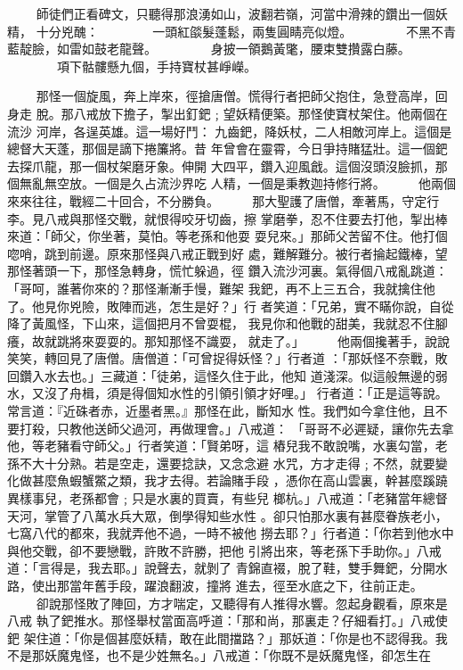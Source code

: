 \begin{pinyinscope}
{　　
師徒們正看碑文，只聽得那浪湧如山，波翻若嶺，河當中滑辣的鑽出一個妖精，
十分兇醜：
　　　　一頭紅燄髮蓬鬆，兩隻圓睛亮似燈。
　　　　不黑不青藍靛臉，如雷如鼓老龍聲。
　　　　身披一領鵝黃氅，腰束雙攢露白藤。
　　　　項下骷髏懸九個，手持寶杖甚崢嶸。

　　
那怪一個旋風，奔上岸來，徑搶唐僧。慌得行者把師父抱住，急登高岸，回身走
脫。那八戒放下擔子，掣出釘鈀﹔望妖精便築。那怪使寶杖架住。他兩個在流沙
河岸，各逞英雄。這一場好鬥：
九齒鈀，降妖杖，二人相敵河岸上。這個是總督大天蓬，那個是謫下捲簾將。昔
年曾會在靈霄，今日爭持賭猛壯。這一個鈀去探爪龍，那一個杖架磨牙象。伸開
大四平，鑽入迎風戧。這個沒頭沒臉抓，那個無亂無空放。一個是久占流沙界吃
人精，一個是秉教迦持修行將。
　　
他兩個來來往往，戰經二十回合，不分勝負。
　　
那大聖護了唐僧，牽著馬，守定行李。見八戒與那怪交戰，就恨得咬牙切齒，擦
掌磨拳，忍不住要去打他，掣出棒來道：「師父，你坐著，莫怕。等老孫和他耍
耍兒來。」那師父苦留不住。他打個唿哨，跳到前邊。原來那怪與八戒正戰到好
處，難解難分。被行者掄起鐵棒，望那怪著頭一下，那怪急轉身，慌忙躲過，徑
鑽入流沙河裏。氣得個八戒亂跳道：「哥呵，誰著你來的？那怪漸漸手慢，難架
我鈀，再不上三五合，我就擒住他了。他見你兇險，敗陣而逃，怎生是好？」行
者笑道：「兄弟，實不瞞你說，自從降了黃風怪，下山來，這個把月不曾耍棍，
我見你和他戰的甜美，我就忍不住腳癢，故就跳將來耍耍的。那知那怪不識耍，
就走了。」
　　
他兩個攙著手，說說笑笑，轉回見了唐僧。唐僧道：「可曾捉得妖怪？」行者道
：「那妖怪不奈戰，敗回鑽入水去也。」三藏道：「徒弟，這怪久住于此，他知
道淺深。似這般無邊的弱水，又沒了舟楫，須是得個知水性的引領引領才好哩。」
行者道：「正是這等說。常言道：『近硃者赤，近墨者黑。』那怪在此，斷知水
性。我們如今拿住他，且不要打殺，只教他送師父過河，再做理會。」八戒道：
「哥哥不必遲疑，讓你先去拿他，等老豬看守師父。」行者笑道：「賢弟呀，這
樁兒我不敢說嘴，水裏勾當，老孫不大十分熟。若是空走，還要捻訣，又念念避
水咒，方才走得﹔不然，就要變化做甚麼魚蝦蟹鱉之類，我才去得。若論賭手段
，憑你在高山雲裏，幹甚麼蹊蹺異樣事兒，老孫都會﹔只是水裏的買賣，有些兒
榔杭。」八戒道：「老豬當年總督天河，掌管了八萬水兵大眾，倒學得知些水性
。卻只怕那水裏有甚麼眷族老小，七窩八代的都來，我就弄他不過，一時不被他
撈去耶？」行者道：「你若到他水中與他交戰，卻不要戀戰，許敗不許勝，把他
引將出來，等老孫下手助你。」八戒道：「言得是，我去耶。」說聲去，就剝了
青錦直裰，脫了鞋，雙手舞鈀，分開水路，使出那當年舊手段，躍浪翻波，撞將
進去，徑至水底之下，往前正走。
　　
卻說那怪敗了陣回，方才喘定，又聽得有人推得水響。忽起身觀看，原來是八戒
執了鈀推水。那怪舉杖當面高呼道：「那和尚，那裏走？仔細看打。」八戒使鈀
架住道：「你是個甚麼妖精，敢在此間擋路？」那妖道：「你是也不認得我。我
不是那妖魔鬼怪，也不是少姓無名。」八戒道：「你既不是妖魔鬼怪，卻怎生在
}
\end{pinyinscope}
